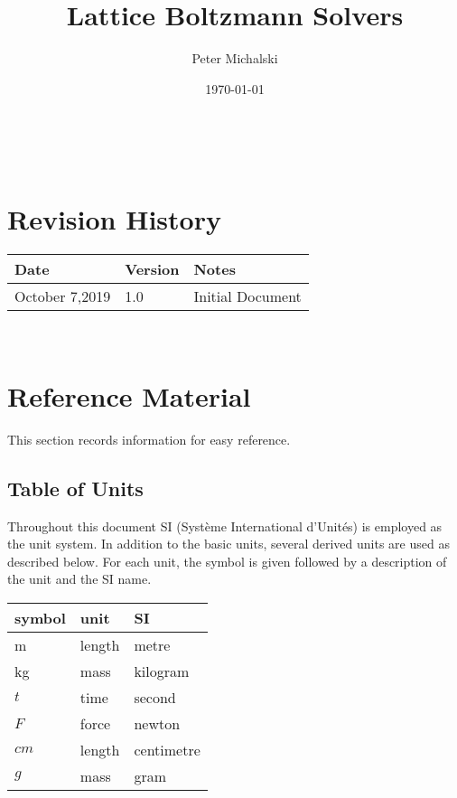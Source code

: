 \documentclass[12pt]{article}
\newcommand{\famname}{Lattice Boltzmann Solvers} %
\begin{document}
\title{\famname} 
\author{Peter Michalski}
\date{\today}

\maketitle

~\newpage


\section{Revision History}

\begin{tabularx}{\textwidth}{p{3cm}p{2cm}X}
\toprule {\bf Date} & {\bf Version} & {\bf Notes}\\
\midrule
October 7,2019 & 1.0 & Initial Document\\
\bottomrule
\end{tabularx}

~\newpage
	
\section{Reference Material}

This section records information for easy reference.

\subsection{Table of Units}

Throughout this document SI (Syst\`{e}me International d'Unit\'{e}s) is employed
as the unit system.  In addition to the basic units, several derived units are
used as described below.  For each unit, the symbol is given followed by a
description of the unit and the SI name.
~\newline

\renewcommand{\arraystretch}{1.2}
  \noindent \begin{tabular}{l l l} 
    \toprule		
    \textbf{symbol} & \textbf{unit} & \textbf{SI}\\
    \midrule 
    \si{\metre} & length & metre\\
    \si{\kilogram} & mass	& kilogram\\
    $t$ & time & second\\
    $F$ & force & newton\\
    $cm$ & length & centimetre\\
    $g$ & mass & gram \\
    \bottomrule
  \end{tabular}
\end{document}
